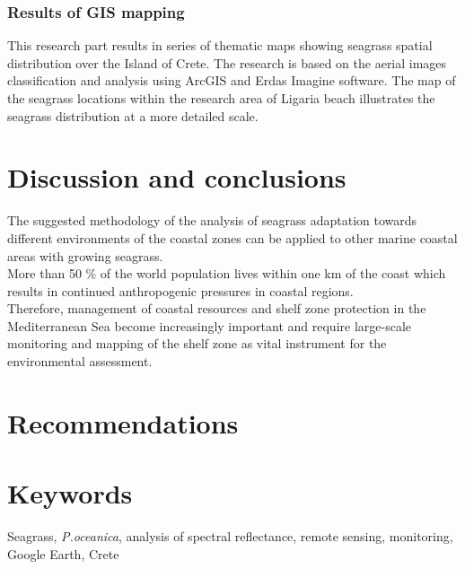 \documentclass[10pt, a4paper]{article}
\begin{document}
\subsubsection{Results of GIS mapping}
This research part results in series of thematic maps showing seagrass spatial distribution over the Island of
Crete. The research is based on the aerial images classification and analysis using ArcGIS and Erdas Imagine
software. The map of the seagrass locations within the research area of Ligaria beach illustrates the seagrass
distribution at a more detailed scale.

\pagebreak
\section{Discussion and conclusions}\label{sec:5}
The suggested methodology of the analysis of seagrass adaptation towards different environments of
the coastal zones can be applied to other marine coastal areas with growing seagrass.\\
More than 50 \% of the world population lives within one km of the coast which results in continued
anthropogenic pressures in coastal regions. \\Therefore, management of coastal resources and shelf
zone protection in the Mediterranean Sea become increasingly important and require large-scale
monitoring and mapping of the shelf zone as vital instrument for the environmental assessment.
\pagebreak

\section{Recommendations}\label{sec:6}

\section{Keywords}
Seagrass, \textit{P.oceanica}, analysis of spectral reflectance, remote sensing, monitoring, Google Earth, Crete
\pagebreak
\end{document}
